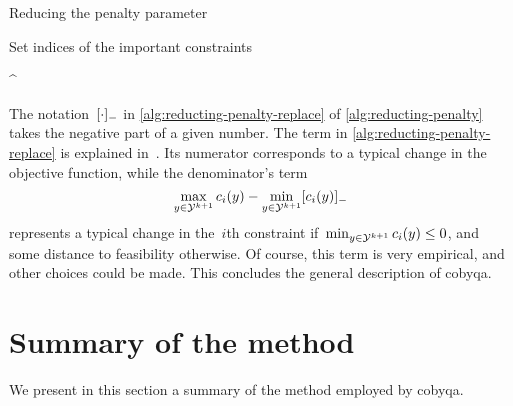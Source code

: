 \begin{algorithm}
    \caption{Reducing the penalty parameter}
    \label{alg:reducting-penalty}
    \DontPrintSemicolon
    \onehalfspacing
    Set indices of the important constraints
    \begin{algomathdisplay}
        \iub^{\ast} \eqdef {}
    \end{algomathdisplay}
\end{algorithm}
%

The notation~$[\cdot]_-$ in \cref{alg:reducting-penalty-replace} of \cref{alg:reducting-penalty} takes the negative part of a given number.
The term in \cref{alg:reducting-penalty-replace} is explained in~\cite[\S~4]{Powell_1994}.
Its numerator corresponds to a typical change in the objective function, while the denominator's term
\begin{equation*}
    \max_{y \in \xpt[k + 1]} \con{i}(y) - \min_{y \in \xpt[k + 1]} \negp{\con{i}(y)}
\end{equation*}
represents a typical change in the~$i$th constraint if~$\min_{y \in \xpt[k + 1]} \con{i}(y) \le 0$, and some distance to feasibility otherwise.
Of course, this term is very empirical, and other choices could be made.
This concludes the general description of \gls{cobyqa}.

\section{Summary of the method}

We present in this section a summary of the method employed by \gls{cobyqa}.

